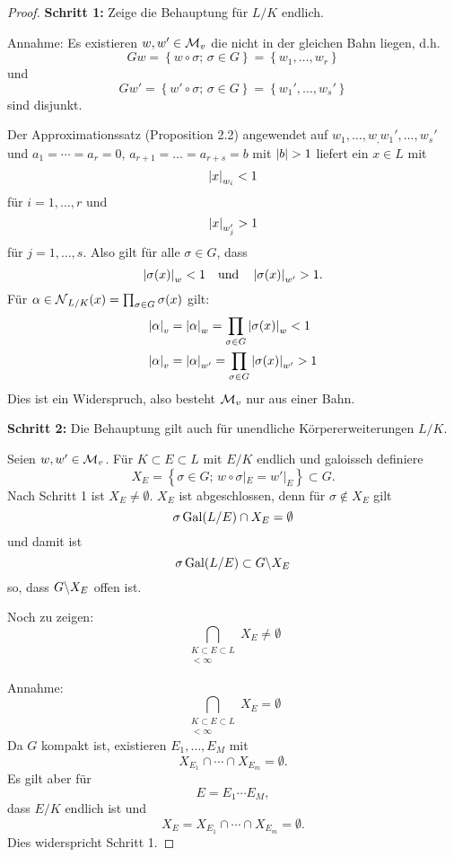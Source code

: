 \begin{proof}
	\textbf{Schritt 1:} Zeige die Behauptung für $L/K$ endlich.
	
	\bigskip
	Annahme: Es existieren $w,w' \in \mathcal{M}_v$ die nicht in der gleichen Bahn liegen, d.h.
	\[ Gw = \left\{  w\circ\sigma; \, \sigma \in G \right\}
	= \left\{ w_1, \dots, w_r \right\}
	\]
	und
	\[ Gw' = \left\{  w'\circ\sigma; \, \sigma \in G \right\}
	= \left\{ w_1', \dots, w_s' \right\}
	\]
	sind disjunkt.
	
	
	\bigskip
	Der Approximationssatz (Proposition 2.2) angewendet auf $w_1,\dots, w_, w_1', \dots, w_s'$ und
	$a_1= \cdots = a_r =0$, $a_{r+1} = \dots = a_{r+s} = b$ mit $\abs{b}>1$ liefert ein $x\in L$ mit
	\[ \left|{x}\right|_{w_i} < 1
	\]
	für $i=1,\dots, r$ und
	\[ \left|{x}\right|_{w_j'} > 1
	\]
	für $j=1,\dots, s$. Also gilt für alle $\sigma \in G$, dass
	\[ \left|{\sigma(x)}\right|_{w} <1
	\quad \text{und} \quad
	 \left|{\sigma(x)}\right|_{w'} >1.
	\]
	Für $\alpha \in \operatorname{\mathcal{N}}_{L/K} (x) = \prod_{\sigma \in G} \sigma(x)$ gilt:
	\begin{align*}
	\left|{\alpha}\right|_v
	&= \left|{\alpha}\right|_w 
	= \prod_{\sigma \in G} \left|{\sigma(x)}\right|_w
	<1 \\
	\left|{\alpha}\right|_v
	&= \left|{\alpha}\right|_{w'}
	= \prod_{\sigma \in G} \left|{\sigma(x)}\right|_{w'}
	>1
	\end{align*}
	Dies ist ein Widerspruch, also besteht $\mathcal{M}_v$ nur aus einer Bahn.
	
	\bigskip \textbf{Schritt 2:} Die Behauptung gilt auch für unendliche Körpererweiterungen $L/K$.
	
	Seien $w,w' \in \mathcal{M}_v$. Für $K \subset E \subset L$ mit $E/K$ endlich und galoissch definiere
	\[ X_E = \left\{
	\sigma \in G; \, w\circ\sigma|_E = w'|_E
	\right\}
	\subset G.
	\]
	Nach Schritt 1 ist $X_E \neq \emptyset$. $X_E$ ist abgeschlossen, denn für $\sigma \not \in X_E$ gilt
	\[ \sigma \operatorname{Gal}(L/E) \cap X_E = \emptyset
	\]
	und damit ist
	\[ \sigma \operatorname{Gal}(L/E) \subset G \backslash X_E
	\]
	so, dass $G \backslash X_E$ offen ist.
	
	\bigskip
	Noch zu zeigen: 
	\[ \bigcap_{\substack{K \subset E\subset L \\ [E/K]< \infty}} X_E \neq \emptyset
	\]
	
	Annahme: 
	\[ \bigcap_{\substack{K \subset E\subset L \\ [E/K]< \infty}} X_E = \emptyset
	\]
	Da $G$ kompakt ist, existieren $E_1, \dots, E_M$ mit
	\[ X_{E_1} \cap \cdots \cap X_{E_m} = \emptyset.
	\]
	Es gilt aber für
	\[ E = E_1 \cdots E_M,
	\]
	dass $E/K$ endlich ist und 
	\[ X_E = X_{E_1} \cap \cdots \cap X_{E_m} = \emptyset.
	\]
	Dies widerspricht Schritt 1.
\end{proof}

